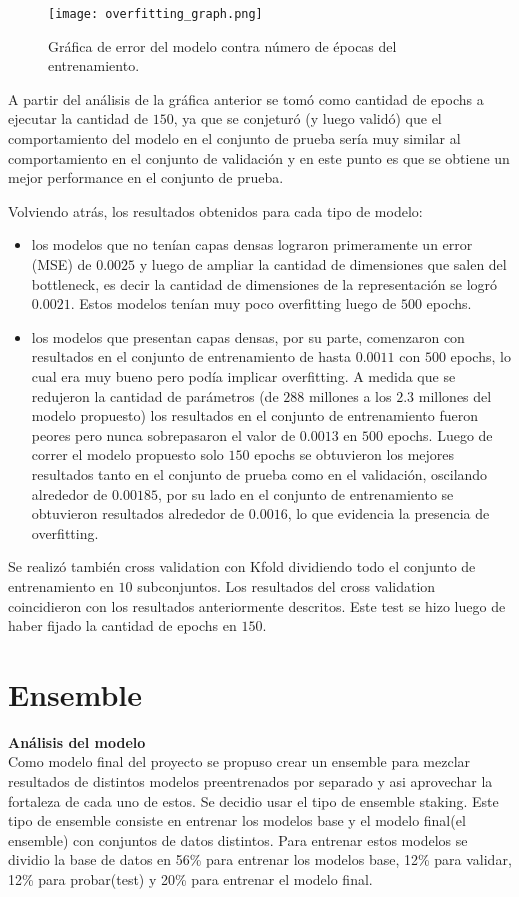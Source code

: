 \documentclass[colorinlistoftodos,twoside,twocolumn,10pt]{article} %
\begin{document}
\begin{figure}[h!]
	\begin{center}
		\texttt{[image: overfitting\_graph.png]}
		\caption{Gr\'afica de error del modelo contra n\'umero de \'epocas del entrenamiento.}
	\end{center}
\end{figure}

A partir del an\'alisis de la gr\'afica anterior se tom\'o como cantidad de epochs a ejecutar la cantidad de $150$, ya que se conjetur\'o (y luego valid\'o) que el comportamiento del modelo en el conjunto de prueba ser\'ia muy similar al comportamiento en el conjunto de validaci\'on y en este punto es que se obtiene un mejor performance en el conjunto de prueba. 

Volviendo atr\'as, los resultados obtenidos para cada tipo de modelo:
\begin{itemize}
	\item los modelos que no ten\'ian capas densas lograron primeramente un error (MSE) de $0.0025$ y luego de ampliar la   cantidad de dimensiones que salen del bottleneck, es decir la cantidad de dimensiones de la representaci\'on se logr\'o $0.0021$. Estos modelos ten\'ian muy poco overfitting luego de $500$ epochs.
	\item los modelos que presentan capas densas, por su parte, comenzaron con resultados en el conjunto de entrenamiento de hasta $0.0011$ con $500$ epochs, lo cual era muy bueno pero pod\'ia implicar overfitting. A medida que se redujeron la cantidad de par\'ametros (de $288$ millones a los $2.3$ millones del modelo propuesto) los resultados en el conjunto de entrenamiento fueron peores pero nunca sobrepasaron el valor de $0.0013$ en $500$ epochs. Luego de correr el modelo propuesto solo $150$ epochs se obtuvieron los mejores resultados tanto en el conjunto de prueba como en el validaci\'on, oscilando alrededor de $0.00185$, por su lado en el conjunto de entrenamiento se obtuvieron resultados alrededor de $0.0016$, lo que evidencia la presencia de overfitting.
\end{itemize}

Se realiz\'o tambi\'en cross validation con Kfold dividiendo todo el conjunto de entrenamiento en $10$ subconjuntos. Los resultados del cross validation coincidieron con los resultados anteriormente descritos. Este test se hizo luego de haber fijado la cantidad de epochs en $150$.

\section{Ensemble}
\textbf{\large An\'alisis del modelo}\\
Como modelo final del proyecto se propuso crear un ensemble para mezclar resultados de distintos modelos preentrenados por separado y asi aprovechar la fortaleza de cada uno de estos. Se decidio usar el tipo de ensemble staking. Este tipo de ensemble consiste en entrenar los modelos base y el modelo final(el ensemble) con conjuntos de datos distintos. Para entrenar estos modelos se dividio la base de datos en 56\% para entrenar los modelos base, 12\% para validar, 12\% para probar(test) y 20\% para entrenar el modelo final.
\end{document}
